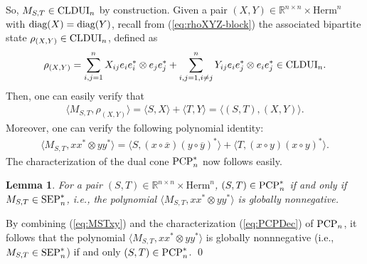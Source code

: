 \documentclass[11pt]{article}
\makeatletter
\newcommand{\R}{\ensuremath{\mathbb{R}}}   %
\newcommand{\C}{\ensuremath{\mathbb{C}}} %
\newcommand{\Herm}{\mathrm{Herm}}
\newcommand{\PCP}{\text{\rm PCP}}
\newcommand{\SEP}{\text{\rm SEP}}
\newcommand{\CLDUI}{\text{\rm CLDUI}}
\newcommand{\diag}{\text{\rm diag}}
\newcommand{\ot}{\otimes}
\newcommand{\ovx}{\overline x}
\newcommand{\ovy}{\overline y}
\theoremstyle{plain}
\newtheorem{lemma}[satz]{Lemma}
\renewenvironment{proof}[1][\proofname]{%
  \par
  \pushQED{}%
  \normalfont
  \topsep6\p@\@plus6\p@
  \trivlist
  \item[\hskip\labelsep\itshape #1\@addpunct{.}]%
}{%
  \popQED
  \endtrivlist
}
\makeatother
\begin{document}
\noindent
So, $M_{S,T}\in \CLDUI_n$ by construction.
Given a pair $(X,Y)\in \R^{n\times n}\times \Herm^n$ with $\diag(X)=\diag(Y)$, recall from (\ref{eq:rhoXYZ-block})   the associated   bipartite state $\rho_{(X,Y)}\in\CLDUI_n$, defined as
\begin{align}\label{eq:rhoXYdef}
\rho_{(X,Y)}=
 \sum_{i,j=1}^n X_{ij}e_ie_i^*\ot e_je_j^*
+ \sum_{i,j=1, i\ne j}^n Y_{ij}e_ie_j^*\ot e_ie_j^*\in \CLDUI_n.
\end{align}
Then, one can easily verify that 
\begin{align}\label{eq:MST-rhoXY}
\langle M_{S,T}, \rho_{(X,Y)}\rangle = \langle S,X\rangle +\langle T,Y\rangle = \langle (S,T),(X,Y)\rangle.
\end{align}
Moreover, 
one can verify the following polynomial identity:
\begin{align}\label{eq:MSTxy}
\langle M_{S,T}, x x^*\ot y y^*\rangle =
\langle S,(x \circ \ovx) (y \circ \ovy)^*\rangle 
+\langle T, (x \circ y) (x\circ y)^*\rangle.
\end{align}
The characterization of the dual cone $\PCP_n^*$ now follows easily.

\begin{lemma}\label{lem:PCP-dual}
For a pair $(S,T)\in \R^{n\times n}\times \Herm^n $, $(S,T)\in \PCP_n^*$ if and only if $M_{S,T}\in \SEP_n^*$, i.e., the polynomial $\langle M_{S,T},xx^*\ot yy^*\rangle$ is globally nonnegative.
 \end{lemma}
\begin{proof}
By combining (\ref{eq:MSTxy}) and  the characterization (\ref{eq:PCPDec}) of $\PCP_n$,  it follows that the polynomial $\langle M_{S,T}, x x^*\ot y y^*\rangle$ is globally nonnnegative (i.e., $M_{S,T}\in\SEP_n^*$) if and only  $(S,T)\in\PCP_n^*$.
\qed\end{proof}
\end{document}
